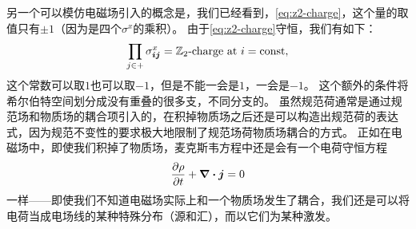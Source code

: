 另一个可以模仿电磁场引入的概念是，我们已经看到，\eqref{eq:z2-charge}，这个量的取值只有$\pm 1$（因为是四个$\sigma^x$的乘积）。
由于\eqref{eq:z2-charge}守恒，我们有如下：
\begin{equation}
    \prod_{j \in +} \sigma^x_{\vb*{i} \vb*{j}} = \text{$\mathbb{Z}_2$-charge at $i$} = \mathrm{const},
    \label{eq:gauss-z2}
\end{equation}
这个常数可以取$1$也可以取$-1$，但是不能一会是$1$，一会是$-1$。
这个额外的条件将希尔伯特空间划分成没有重叠的很多支，不同分支的。
虽然规范荷通常是通过规范场和物质场的耦合项引入的，在积掉物质场之后还是可以构造出规范荷的表达式，因为规范不变性的要求极大地限制了规范场荷物质场耦合的方式。
正如在电磁场中，即使我们积掉了物质场，麦克斯韦方程中还是会有一个电荷守恒方程
\[
    \pdv{\rho}{t} + \div{\vb*{j}} = 0
\]
一样——即使我们不知道电磁场实际上和一个物质场发生了耦合，我们还是可以将电荷当成电场线的某种特殊分布（源和汇），而以它们为某种激发。%
